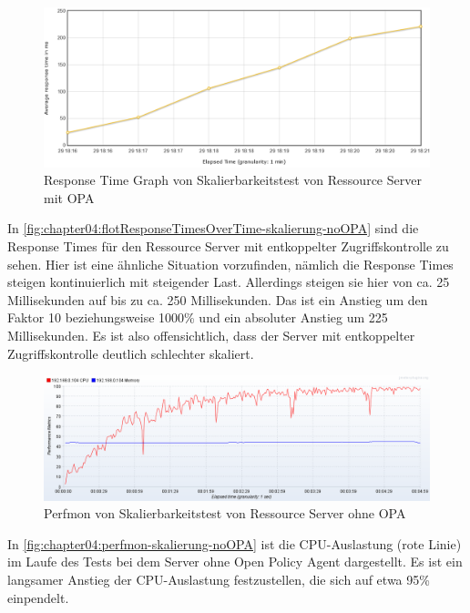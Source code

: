 \begin{figure}[htbp]
  \centering
  \includegraphics[width=1.0\textwidth]{gfx/flotResponseTimesOverTime-skalierung-opa.png}
  \caption{Response Time Graph von Skalierbarkeitstest von Ressource Server mit OPA}
  \label{fig:chapter04:flotResponseTimesOverTime-skalierung-noOPA}
\end{figure}

In \autoref{fig:chapter04:flotResponseTimesOverTime-skalierung-noOPA} sind die Response Times für den Ressource Server mit entkoppelter Zugriffskontrolle zu sehen. Hier ist eine ähnliche Situation vorzufinden, nämlich die Response Times steigen kontinuierlich mit steigender Last. Allerdings steigen sie hier von ca. 25 Millisekunden auf bis zu ca. 250 Millisekunden. Das ist ein Anstieg um den Faktor 10 beziehungsweise 1000\% und ein absoluter Anstieg um 225 Millisekunden. Es ist also offensichtlich, dass der Server mit entkoppelter Zugriffskontrolle deutlich schlechter skaliert. 

\begin{figure}[htbp]
  \centering
  \includegraphics[width=1.0\textwidth]{gfx/perfmon-skalierung-noOPA.png}
  \caption{Perfmon von Skalierbarkeitstest von Ressource Server ohne OPA}
  \label{fig:chapter04:perfmon-skalierung-noOPA}
\end{figure}

In \autoref{fig:chapter04:perfmon-skalierung-noOPA} ist die CPU-Auslastung (rote Linie) im Laufe des Tests bei dem Server ohne Open Policy Agent dargestellt. Es ist ein langsamer Anstieg der CPU-Auslastung festzustellen, die sich auf etwa 95\% einpendelt. 

